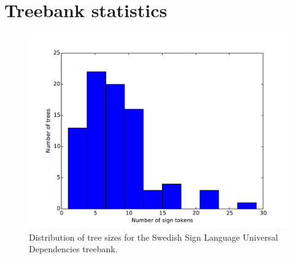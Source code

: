 \documentclass[11pt]{article}
\begin{document}

\section{Treebank statistics}

\begin{figure}[tb]
	\centering
	\includegraphics[width=\linewidth]{treesizes.pdf}
    \caption{Distribution of tree sizes for the Swedish Sign
        Language Universal Dependencies treebank.}
	\label{fig:treesizes}
\end{figure}
\end{document}
